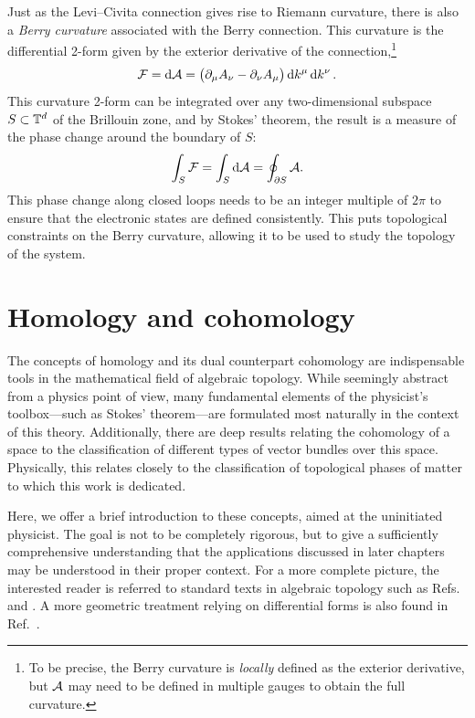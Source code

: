 Just as the Levi--Civita connection gives rise to Riemann curvature, there is also a \emph{Berry curvature} associated with the Berry connection. This curvature is the differential 2-form given by the exterior derivative of the connection,\footnote{
	To be precise, the Berry curvature is \emph{locally} defined as the exterior derivative, but $\mathcal{A}$ may need to be defined in multiple gauges to obtain the full curvature.}
\begin{equation*}
	\mathcal{F} = \dd{\mathcal{A}} = \big(\partial_\mu A_\nu - \partial_\nu A_\mu\big) \dd{k^\mu}\dd{k^\nu}.
\end{equation*}
This curvature 2-form can be integrated over any two-dimensional subspace $S\subset\mathbb{T}^d$ of the Brillouin zone, and by Stokes' theorem, the result is a measure of the phase change around the boundary of $S$:
\begin{equation*}
	\int_S \mathcal{F} = \int_S \dd{\mathcal{A}} = \oint_{\partial S} \mathcal{A}.
\end{equation*}
This phase change along closed loops needs to be an integer multiple of $2\pi$ to ensure that the electronic states are defined consistently. This puts topological constraints on the Berry curvature, allowing it to be used to study the topology of the system.


\section{Homology and cohomology}\label{sec:homology-cohomology}

The concepts of homology and its dual counterpart cohomology are indispensable tools in the mathematical field of algebraic topology. While seemingly abstract from a physics point of view, many fundamental elements of the physicist's toolbox---such as Stokes' theorem---are formulated most naturally in the context of this theory. Additionally, there are deep results relating the cohomology of a space to the classification of different types of vector bundles over this space. Physically, this relates closely to the classification of topological phases of matter to which this work is dedicated.

Here, we offer a brief introduction to these concepts, aimed at the uninitiated physicist. The goal is not to be completely rigorous, but to give a sufficiently comprehensive understanding that the applications discussed in later chapters may be understood in their proper context. For a more complete picture, the interested reader is referred to standard texts in algebraic topology such as Refs.~\cite{Hatcher_algebraic-topology} and \cite{Bredon_topo-geometry}. A more geometric treatment relying on differential forms is also found in Ref.~\cite{Bott-Tu_differential-forms}.

